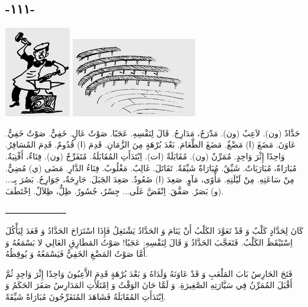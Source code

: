 \documentclass[a5paper]{article}
\begin{document}
\subsection[-١١١-]{-١١١-}
 \includegraphics[width=1.1354in,height=1.5626in]{images/MuhammadBagauddinprettified-img287.png}   \includegraphics[width=2.1563in,height=1.3646in]{images/MuhammadBagauddinprettified-img288.png} 

حَدَّادٌ (ون). لاَعِبٌ (ون). مَدْرَجٌ، مَدَارِجُ. قَالَ لِنَفْسِهِ. عَجَبًا. صَوْتٌ عَالٍ. خَفِيٌّ. صَوْتٌ خَفِيٌّ. عَاوَنَ. مَضَغَ (ا) مَضْغٌ. مَضَغَ الطَّعَامَ. بَعْدَ بُرْهَةٍ مِنَ الزَّمَانِ. قَدِمَ (ا) قُدُومٌ. قَدِمَ المُسَافِرُ. وَاحِدًا إِثْرَ وَاحِدٍ. مُمَرِّنٌ (ون). مُقَابَلَةٌ (ات). اِبْتَدَأَتِ المُقَابَلَةُ. مُتَفَرِّجٌ (ون). فِنَاءٌ، أَفْنِيَةٌ. مُبَارَاةٌ، مُبَارَيَاتٌ. شَيِّقٌ. مُبَارَاةٌ شَيِّقَةٌ. تَقَاتَلَ. غَالِبٌ. مَغْلُوبٌ. فِنَاءُ الدَّارِ. مَضَى (ي) مُضِيٌّ. مِنْ سَاعَتِهِ. مِنْ لَيْلَتِهِ. مَأْوًى، مَآوٍ. صَعِدَ (ا) صُعُودٌ. صَعِدَ الجَبَلَ. جَارِحَةٌ، جَوَارِحُ. بَصُرَ بِـ... (و) بَصَرٌ. صَفَّقَ. اِنْقَضَّ عَلَى... جِسْرٌ، جُسُورٌ. ظِلٌّ، ظِلاَلٌ. اِخْتَطَفَ.

ـــــــــــــــــــــــــ

كَانَ لِحَدَّادٍ كَلْبٌ وَ قَدْ تَعَوَّدَ الكَلْبُ أَنْ يَنَامَ وَ الحَدَّادُ يَشْتَغِلُ فَإِذَا اسْتَرَاحَ الحَدَّادُ وَ قَعَدَ لِيَأْكُلَ اِسْتَيْقَظَ الكَلْبُ. فَتَعَجَّبَ الحَدَّادُ وَ قَالَ لِنَفْسِهِ: عَجَبًا! صَوْتُ المَطَارِقِ العَالِي لا بَسْمَعُهُ وَ أَمَّا صَوْتُ المَضْغِ الخَفِيُّ فَيَسْمَعُهُ وَ يُوقِظُهُ.

فَتَحَ الحَارِسُ بَابَ المَلْعَبِ وَ قَدْ عَاوَنَهُ وَلَدَاهُ وَ بَعْدَ بُرْهَةٍ قَدِمَ الاَّعِبُونَ وَاحِدًا إِثْرَ وَاحِدٍ ثُمَّ أَقْبَلَ المُمَرِّنُ فِي سَيَّارَتِهِ الصَّغِيرَةِ. وَ لَمَّا حَانَ الوَقْتُ وَ اِمْتَلَأَتِ المَدَارِسُ صَفَرَ الحَكَمُ وَ اِبْتَدَأَتِ المُقَابَلَةُ فَشَاهَدَ المُتَفَرِّجُونَ مُبَارَاةً شَيِّقَةً.
\end{document}
